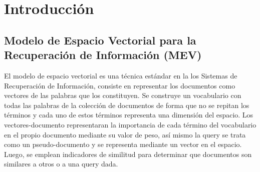 \documentclass[a4paper,12pt,twocolumn]{article}
\begin{document}
\section{Introducción}\label{sec:intro}

\subsection{Modelo de Espacio Vectorial para la Recuperación de Información (MEV)}
El modelo de espacio vectorial es una técnica estándar en la los Sistemas de Recuperación de
Información, consiste en representar los documentos como vectores de las palabras que los
constituyen. Se construye un vocabulario con todas las palabras de la colección de documentos
de forma que no se repitan los términos y cada uno de estos términos representa una dimensión
del espacio. Los vectores-documento representaran la importancia de cada término del
vocabulario en el propio documento mediante su valor de peso, así mismo la query se trata
como un pseudo-documento y se representa mediante un vector en el espacio. Luego, se
emplean indicadores de similitud para determinar que documentos son similares a otros o a una
query dada.
\end{document}
